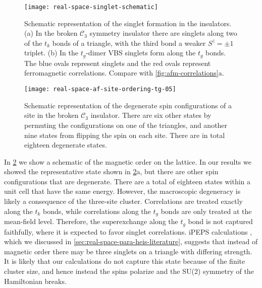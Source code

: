 \documentclass[reprint,aps,prb,amsmath,amssymb]{revtex4-2}
\begin{document}
\begin{figure}
	\centering
	\texttt{[image: real-space-singlet-schematic]}
	\caption
	{\label{fig:singlet-schematic}
		Schematic representation of the singlet formation in the insulators. 
		(a) In the broken $\mathcal{C}_3$ symmetry insulator there are singlets along two of the $t_k$ bonds of a triangle, with the third bond a weaker $S^z = \pm 1$ triplet.
		(b) In the $t_g$-dimer VBS singlets form along the $t_g$ bonds.
		The blue ovals represent singlets and the red ovals represent ferromagnetic correlations. Compare with \cref{fig:afm-correlations}a.
	}
\end{figure}

\begin{figure}
	\centering
	\texttt{[image: real-space-af-site-ordering-tg-05]}
	\caption
	{\label{fig:afm-schematic-order}
		Schematic representation of the degenerate spin configurations of a site in the broken $\mathcal{C}_3$ insulator.
		There are six other states by permuting the configurations on one of the triangles, and another nine states from flipping the spin on each site. There are in total eighteen degenerate states.
	}
\end{figure}

In \cref{fig:afm-schematic-order} we show a schematic of the magnetic order on the lattice. In our results we showed the representative state shown in \cref{fig:afm-schematic-order}a, but there are other spin configurations that are degenerate. There are a total of eighteen states within a unit cell that have the same energy. However, the macroscopic degeneracy is likely a consequence of the three-site cluster. Correlations are treated exactly along the $t_k$ bonds, while correlations along the $t_g$ bonds are only treated at the mean-field level. Therefore, the superexchange along the $t_g$ bond is not captured faithfully, where it is expected to favor singlet correlations. iPEPS calculations \cite{Jahromi2018}, which we discussed in \cref{sec:real-space-para-heis-literature}, suggests that instead of magnetic order there may be three singlets on a triangle with differing strength. It is likely that our calculations do not capture this state because of the finite cluster size, and hence instead the spins polarize and the SU(2) symmetry of the Hamiltonian breaks. 
\end{document}
